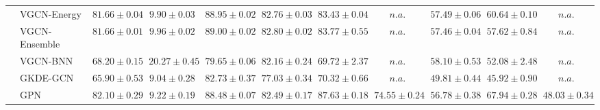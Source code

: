 \begin{table*}[!h]
{\begin{tabular}{ll|cc|cccc|ccc}
        & VGCN-Energy & ${81.66\scriptscriptstyle \pm 0.04}$ & ${9.90\scriptscriptstyle \pm 0.03}$ & ${88.95\scriptscriptstyle \pm 0.02}$ & ${82.76\scriptscriptstyle \pm 0.03}$ & ${83.43\scriptscriptstyle \pm 0.04}$ & $n.a.$ & ${57.49\scriptscriptstyle \pm 0.06}$ & ${60.64\scriptscriptstyle \pm 0.10}$ & $n.a.$\\
        & VGCN-Ensemble & ${81.66\scriptscriptstyle \pm 0.01}$ & ${9.96\scriptscriptstyle \pm 0.02}$ & ${\mathbf{89.00}\scriptscriptstyle \pm 0.02}$ & ${82.80\scriptscriptstyle \pm 0.02}$ & ${83.77\scriptscriptstyle \pm 0.55}$ & $n.a.$ & ${57.46\scriptscriptstyle \pm 0.04}$ & ${57.62\scriptscriptstyle \pm 0.84}$ & $n.a.$\\
        & VGCN-BNN & ${68.20\scriptscriptstyle \pm 0.15}$ & ${20.27\scriptscriptstyle \pm 0.45}$ & ${79.65\scriptscriptstyle \pm 0.06}$ & ${82.16\scriptscriptstyle \pm 0.24}$ & ${69.72\scriptscriptstyle \pm 2.37}$ & $n.a.$ & ${58.10\scriptscriptstyle \pm 0.53}$ & ${52.08\scriptscriptstyle \pm 2.48}$ & $n.a.$\\
        & GKDE-GCN & ${65.90\scriptscriptstyle \pm 0.53}$ & ${\mathbf{9.04}\scriptscriptstyle \pm 0.28}$ & ${82.73\scriptscriptstyle \pm 0.37}$ & ${77.03\scriptscriptstyle \pm 0.34}$ & ${70.32\scriptscriptstyle \pm 0.66}$ & $n.a.$ & ${49.81\scriptscriptstyle \pm 0.44}$ & ${45.92\scriptscriptstyle \pm 0.90}$ & $n.a.$\\
        & GPN & ${\mathbf{82.10}\scriptscriptstyle \pm 0.29}$ & ${9.22\scriptscriptstyle \pm 0.19}$ & ${88.48\scriptscriptstyle \pm 0.07}$ & ${82.49\scriptscriptstyle \pm 0.17}$ & ${\mathbf{87.63}\scriptscriptstyle \pm 0.18}$ & ${{74.55}\scriptscriptstyle \pm 0.24}$ & ${56.78\scriptscriptstyle \pm 0.38}$ & ${\mathbf{67.94}\scriptscriptstyle \pm 0.28}$ & ${{48.03}\scriptscriptstyle \pm 0.34}$\\



\end{tabular}}
\end{table*}
